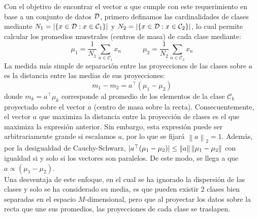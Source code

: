 Con el objetivo de encontrar el vector $a$ que cumple con este requerimiento en base a un conjunto de datos  ${\mathcal D}$, primero definamos las cardinalidades de clases mediante $N_1 = |\{x\in{\mathcal D}:x\in{\mathcal C}_1\}|$ y $N_2 = |\{x\in{\mathcal D}:x\in{\mathcal C}_2\}|$, lo cual permite calcular los promedios muestrales (centros de masa) de cada  clase mediante: 
\begin{equation}
	\mu_1=\frac{1}{N_1}\sum_{n\in\mathcal{C}_1}x_n
	\quad\quad\quad
	\mu_2=\frac{1}{N_2}\sum_{n\in\mathcal{C}_2}x_n
\end{equation}
La medida más simple de separación entre las proyecciones de las clases sobre $a$ es la distancia entre las medias  de sus proyecciones:
\begin{equation}
	m_1 - m_2 = a^\top(\mu_1-\mu_2)
\end{equation}
donde $m_k= a^\top\mu_k$ corresponde al promedio de los elementos de  la clase $\mathcal{C}_k$ proyectado sobre el  vector $a$ (centro de masa sobre la recta). Consecuentemente, el vector $a$ que maximiza la distancia entre la proyección de clases es el que maximiza la expresión anterior. Sin embargo, esta expresión puede ser arbitrariamente grande si escalamos $a$, por lo que se fijará $\left \| a \right \|_2=1$. Además, por la desigualdad de Cauchy-Schwarz, $|a^\top(\mu_1-\mu_2)|\leq \left\lVert a\right\rVert\left\lVert\mu_1-\mu_2\right\rVert$ con igualdad si y solo si los vectores son paralelos. De este modo, se llega a que $a\propto(\mu_1-\mu_2)$. \\

Una desventaja de este enfoque, en el cual se ha ignorado la dispersión de las clases y solo se ha considerado su media, es que pueden existir 2 clases bien separadas en el espacio $M$-dimensional, pero que al proyectar los datos sobre la recta que une sus promedios, las proyecciones de cada clase se traslapen. 

